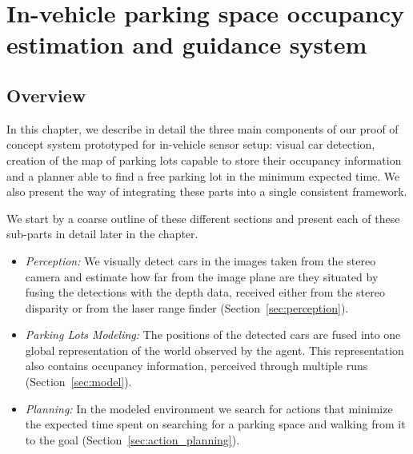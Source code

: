 
\newcommand\Bx{x}
\newcommand\Bm{m}
\def\v{\vm{v}}
\newcommand\vm[1]{\bm{\mathrm{#1}}}
\renewcommand{\v}{{\mbox{a}^i}}
\newcommand{\z}{z_{t}}
\newcommand{\y}{z_{1:t-1}}

\chapter{In-vehicle parking space occupancy estimation and guidance system}
\label{cha:our_approach}

\section{Overview} %
\label{sec:overview}

In this chapter, we describe in detail the three main components of our proof
of concept system prototyped for in-vehicle sensor setup: visual car
detection, creation of the map of parking lots capable to store their
occupancy information and a planner able to find a free parking lot in the
minimum expected time. We also present the way of integrating these parts into
a single consistent framework.

We start by a coarse outline of these different sections and present each of
these sub-parts in detail later in the chapter.

\begin{itemize}

\item \emph{Perception:}  We visually detect cars in the images taken from the
stereo camera and estimate how far from the image plane are they situated by
fusing the detections with the depth data, received either from the stereo
disparity or from the laser range finder (Section~\ref{sec:perception}).

\item \emph{Parking Lots Modeling:}  The positions of the detected cars are
fused into one global representation of the world observed by the agent. This
representation also contains occupancy information, perceived through multiple
runs (Section~\ref{sec:model}).

\item \emph{Planning:}  In the modeled environment we search for actions that
minimize the expected time spent on searching for a parking space and walking
from it to the goal (Section~\ref{sec:action_planning}).

\end{itemize}

